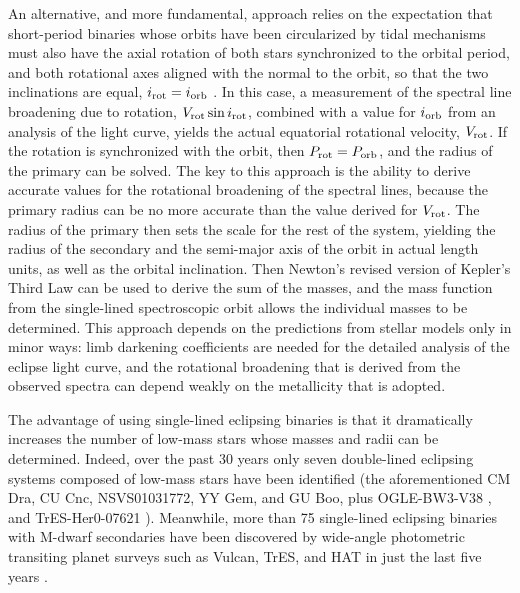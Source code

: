 \documentclass[12pt, preprint]{aastex}
\begin{document}
An alternative, and more fundamental, approach relies on the
expectation that short-period binaries whose orbits have been
circularized by tidal mechanisms must also have the axial rotation of
both stars synchronized to the orbital period, and both rotational
axes aligned with the normal to the orbit, so that the two
inclinations are equal, $i_{\rm rot} = i_{\rm orb}$ \citep[e.g.\
see][]{Hut81,Zahn89}. In this case, a measurement of the spectral
line broadening due to rotation, $V_{\rm rot} \sin i_{\rm rot}$,
combined with a value for $i_{\rm orb}$ from an analysis of the light
curve, yields the actual equatorial rotational velocity, $V_{\rm
rot}$. If the rotation is synchronized with the orbit, then $P_{\rm
rot} = P_{\rm orb}$, and the radius of the primary can be solved. The
key to this approach is the ability to derive accurate values for the
rotational broadening of the spectral lines, because the primary
radius can be no more accurate than the value derived for $V_{\rm
rot}$. The radius of the primary then sets the scale for the rest of
the system, yielding the radius of the secondary and the semi-major
axis of the orbit in actual length units, as well as the orbital
inclination. Then Newton's revised version of Kepler's Third Law can
be used to derive the sum of the masses, and the mass function from
the single-lined spectroscopic orbit allows the individual masses to
be determined. This approach depends on the predictions from stellar
models only in minor ways: limb darkening coefficients are needed for
the detailed analysis of the eclipse light curve, and the rotational
broadening that is derived from the observed spectra can depend weakly
on the metallicity that is adopted.

The advantage of using single-lined eclipsing binaries is that it
dramatically increases the number of low-mass stars whose masses and
radii can be determined. Indeed, over the past 30 years only seven
double-lined eclipsing systems composed of low-mass stars have been
identified (the aforementioned CM Dra, CU Cnc, NSVS01031772, YY Gem,
and GU Boo, plus OGLE-BW3-V38 \citep{maceroni2004}, and
TrES-Her0-07621 \citep{creevey2005}). Meanwhile, more than 75
single-lined eclipsing binaries with M-dwarf secondaries have been
discovered by wide-angle photometric transiting planet surveys such as Vulcan, TrES, and HAT in just the last five
years \citep{Latham2007}.
\end{document}
